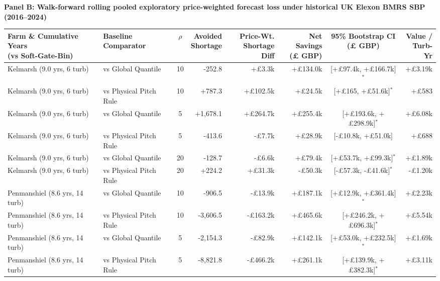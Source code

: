 \documentclass[
  journal]{IEEEtran}
\begin{document}
\begin{table}[!t]
\noindent\textbf{Panel B: Walk-forward rolling pooled exploratory price-weighted forecast loss under historical UK Elexon BMRS SBP (2016--2024)}\par
\vspace{1mm}
\begin{tabular*}{\textwidth}{@{\extracolsep{\fill}}llcrrrcr@{}}
\toprule
\shortstack[l]{Farm \& Cumulative Years\\(vs Soft-Gate-Bin)} & \shortstack[l]{Baseline\\Comparator} & $\rho$ & \shortstack{Avoided\\Shortage} & \shortstack{Price-Wt.\\Shortage Diff} & \shortstack{Net Savings\\(£ GBP)} & \shortstack{95\% Bootstrap CI\\(£ GBP)} & \shortstack{Value /\\Turb-Yr} \\
\midrule
Kelmarsh (9.0 yrs, 6 turb) & vs Global Quantile & 10 & -252.8 & +£3.3k & +£134.0k & [+£97.4k, +£166.7k]$^*$ & +£3.19k \\
Kelmarsh (9.0 yrs, 6 turb) & vs Physical Pitch Rule & 10 & +787.3 & +£102.5k & +£24.5k & [+£165, +£51.6k]$^*$ & +£583 \\
Kelmarsh (9.0 yrs, 6 turb) & vs Global Quantile & 5 & +1,678.1 & +£264.7k & +£255.4k & [+£193.6k, +£298.9k]$^*$ & +£6.08k \\
Kelmarsh (9.0 yrs, 6 turb) & vs Physical Pitch Rule & 5 & -413.6 & -£7.7k & +£28.9k & [-£10.8k, +£51.0k] & +£688 \\
Kelmarsh (9.0 yrs, 6 turb) & vs Global Quantile & 20 & -128.7 & -£6.6k & +£79.4k & [+£53.7k, +£99.3k]$^*$ & +£1.89k \\
Kelmarsh (9.0 yrs, 6 turb) & vs Physical Pitch Rule & 20 & +224.2 & +£31.3k & -£50.3k & [-£57.3k, -£41.6k]$^*$ & -£1.20k \\
\midrule
Penmanshiel (8.6 yrs, 14 turb) & vs Global Quantile & 10 & -906.5 & -£13.9k & +£187.1k & [+£12.9k, +£361.4k]$^*$ & +£2.23k \\
Penmanshiel (8.6 yrs, 14 turb) & vs Physical Pitch Rule & 10 & -3,606.5 & -£163.2k & +£465.6k & [+£246.2k, +£696.3k]$^*$ & +£5.54k \\
Penmanshiel (8.6 yrs, 14 turb) & vs Global Quantile & 5 & -2,154.3 & -£82.9k & +£142.1k & [+£53.0k, +£232.5k]$^*$ & +£1.69k \\
Penmanshiel (8.6 yrs, 14 turb) & vs Physical Pitch Rule & 5 & -8,821.8 & -£466.2k & +£261.1k & [+£139.9k, +£382.3k]$^*$ & +£3.11k \\

\end{tabular*}
\end{table}
\end{document}
